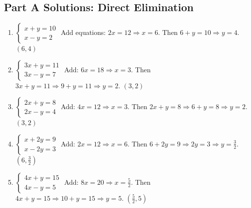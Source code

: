 \documentclass[14pt]{extarticle}
\begin{document}
\subsection*{Part A Solutions: Direct Elimination}
\begin{enumerate}
  \item \(\begin{cases} x + y = 10 \\ x - y = 2 \end{cases}\)  
  Add equations: \(2x = 12 \Rightarrow x = 6\). Then \(6 + y = 10 \Rightarrow y = 4\).  
  \(\boxed{(6, 4)}\)

  \item \(\begin{cases} 3x + y = 11 \\ 3x - y = 7 \end{cases}\)  
  Add: \(6x = 18 \Rightarrow x = 3\). Then \(3x + y = 11 \Rightarrow 9 + y = 11 \Rightarrow y = 2\).  
  \(\boxed{(3, 2)}\)

  \item \(\begin{cases} 2x + y = 8 \\ 2x - y = 4 \end{cases}\)  
  Add: \(4x = 12 \Rightarrow x = 3\). Then \(2x + y = 8 \Rightarrow 6 + y = 8 \Rightarrow y = 2\).  
  \(\boxed{(3, 2)}\)

  \item \(\begin{cases} x + 2y = 9 \\ x - 2y = 3 \end{cases}\)  
  Add: \(2x = 12 \Rightarrow x = 6\). Then \(6 + 2y = 9 \Rightarrow 2y = 3 \Rightarrow y = \tfrac{3}{2}\).  
  \(\boxed{(6, \tfrac{3}{2})}\)

  \item \(\begin{cases} 4x + y = 15 \\ 4x - y = 5 \end{cases}\)  
  Add: \(8x = 20 \Rightarrow x = \tfrac{5}{2}\). Then \(4x + y = 15 \Rightarrow 10 + y = 15 \Rightarrow y = 5\).  
  \(\boxed{(\tfrac{5}{2}, 5)}\)
\end{enumerate}
\end{document}
